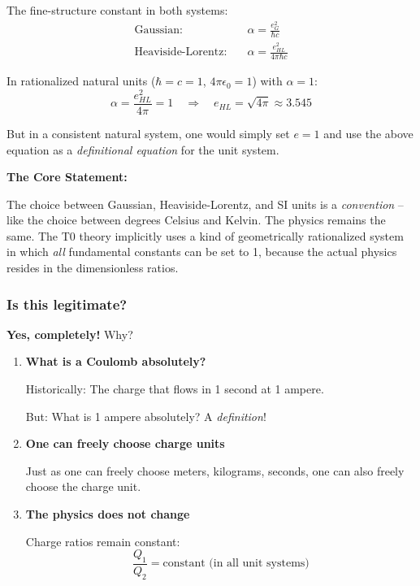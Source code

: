The fine-structure constant in both systems:
\begin{align}
	\text{Gaussian:} \quad &\alpha = \frac{e_G^2}{\hbar c} \\
	\text{Heaviside-Lorentz:} \quad &\alpha = \frac{e_{HL}^2}{4\pi\hbar c}
\end{align}

In rationalized natural units ($\hbar = c = 1$, $4\pi\epsilon_0 = 1$) with $\alpha = 1$:
\begin{equation}
	\alpha = \frac{e_{HL}^2}{4\pi} = 1 \quad \Rightarrow \quad e_{HL} = \sqrt{4\pi} \approx 3.545
\end{equation}

But in a consistent natural system, one would simply set $e = 1$ and use the above equation as a \textit{definitional equation} for the unit system.

\textbf{The Core Statement:}

The choice between Gaussian, Heaviside-Lorentz, and SI units is a \textit{convention} -- like the choice between degrees Celsius and Kelvin. The physics remains the same. The T0 theory implicitly uses a kind of geometrically rationalized system in which \textit{all} fundamental constants can be set to 1, because the actual physics resides in the dimensionless ratios.
\subsubsection{Is this legitimate?}

\textbf{Yes, completely!} Why?

\begin{enumerate}
	\item \textbf{What is a Coulomb absolutely?}
	
	Historically: The charge that flows in 1 second at 1 ampere.
	
	But: What is 1 ampere absolutely? A \textit{definition}!
	
	\item \textbf{One can freely choose charge units}
	
	Just as one can freely choose meters, kilograms, seconds, one can also freely choose the charge unit.
	
	\item \textbf{The physics does not change}
	
	Charge ratios remain constant:
	\begin{equation}
		\frac{Q_1}{Q_2} = \text{constant (in all unit systems)}
	\end{equation}
\end{enumerate}

